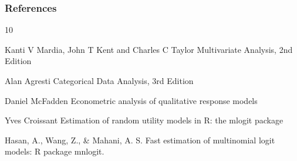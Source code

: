 \documentclass{beamer}
\begin{document}
\begin{frame}[allowframebreaks]
  \frametitle{References}    
  \begin{thebibliography}{10}    


    

    

       \beamertemplatearticlebibitems
Kanti V Mardia, John T Kent and Charles C Taylor
    \newblock  Multivariate Analysis, 2nd Edition



       \beamertemplatearticlebibitems
Alan Agresti
    \newblock  Categorical Data Analysis, 3rd Edition


       \beamertemplatearticlebibitems
Daniel McFadden
    \newblock  Econometric analysis of qualitative response models
    
    
           \beamertemplatearticlebibitems
 Yves Croissant
    \newblock  Estimation of random utility models in R: the mlogit package
    
               \beamertemplatearticlebibitems
 Hasan, A., Wang, Z., \& Mahani, A. S.
    \newblock  Fast estimation of multinomial logit models: R package mnlogit.
    
  \end{thebibliography}
\end{frame}



%
\end{document}
